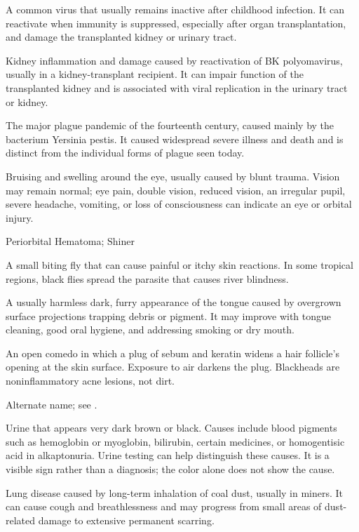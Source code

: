  A common virus that usually remains inactive after childhood infection. It can reactivate when immunity is suppressed, especially after organ transplantation, and damage the transplanted kidney or urinary tract.

 Kidney inflammation and damage caused by
reactivation of BK polyomavirus, usually in a kidney-transplant recipient. It
can impair function of the transplanted kidney and is associated with viral
replication in the urinary tract or kidney.

 The major plague pandemic of the fourteenth century, caused mainly by the bacterium Yersinia pestis. It caused widespread severe illness and death and is distinct from the individual forms of plague seen today.

 Bruising and swelling around the eye, usually caused by blunt trauma. Vision may remain normal; eye pain, double vision, reduced vision, an irregular pupil, severe headache, vomiting, or loss of consciousness can indicate an eye or orbital injury.


\synonyms
Periorbital Hematoma; Shiner

 A small biting fly that can cause painful or itchy skin reactions. In some tropical regions, black flies spread the parasite that causes river blindness.

 A usually harmless dark, furry appearance of the tongue caused by overgrown surface projections trapping debris or pigment. It may improve with tongue cleaning, good oral hygiene, and addressing smoking or dry mouth.

 An open comedo in which a plug of sebum and keratin widens a hair follicle's opening at the skin surface. Exposure to air darkens the plug. Blackheads are noninflammatory acne lesions, not dirt.

 Alternate name; see .

 Urine that appears very dark brown or black. Causes include blood pigments such as hemoglobin or myoglobin, bilirubin, certain medicines, or homogentisic acid in alkaptonuria. Urine testing can help distinguish these causes.
It is a visible sign rather than a diagnosis; the color alone does not show
the cause.

 Lung disease caused by long-term inhalation of coal dust, usually in miners. It can cause cough and breathlessness and may progress from small areas of dust-related damage to extensive permanent scarring.

